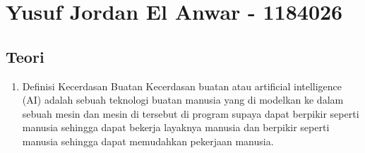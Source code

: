 \section{Yusuf Jordan El Anwar - 1184026}
\subsection{Teori}
\begin{enumerate}

	\item Definisi Kecerdasan Buatan
	\hfill\break
	Kecerdasan buatan atau artificial intelligence (AI) adalah sebuah teknologi buatan manusia yang di modelkan ke dalam sebuah mesin dan mesin di tersebut di program supaya dapat berpikir seperti manusia sehingga dapat bekerja layaknya manusia dan berpikir seperti manusia sehingga dapat memudahkan pekerjaan manusia.


\end{enumerate}
